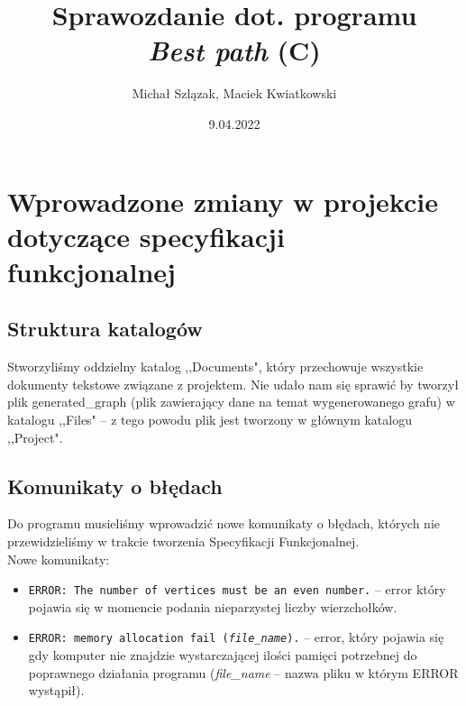 \documentclass[12pt, a4paper]{article}
\begin{document}
\title{Sprawozdanie dot. programu\\ \textit{Best path} (C)}
\date{9.04.2022}
\author{Michał Szlązak, Maciek Kwiatkowski}
\maketitle
\tableofcontents
\thispagestyle{empty}
\cleardoublepage

\newpage

\setcounter{page}{1}

\section{Wprowadzone zmiany w projekcie dotyczące specyfikacji funkcjonalnej}

\subsection{Struktura katalogów}
Stworzyliśmy oddzielny katalog ,,Documents", który przechowuje wszystkie dokumenty tekstowe związane z projektem. Nie udało nam się sprawić by tworzył plik generated\_graph (plik zawierający dane na temat wygenerowanego grafu) w katalogu ,,Files" -- z tego powodu plik jest tworzony w głównym katalogu ,,Project".

\subsection{Komunikaty o błędach}
Do programu musieliśmy wprowadzić nowe komunikaty o błędach, których nie przewidzieliśmy w trakcie tworzenia Specyfikacji Funkcjonalnej.
\\
Nowe komunikaty:
\begin{itemize}
    \item \texttt{ERROR: The number of vertices must be an even number.} -- error który pojawia się w momencie podania nieparzystej liczby wierzchołków.
    \item \texttt{ERROR: memory allocation fail (\textit{file\_name}).} -- error, który pojawia się gdy komputer nie znajdzie wystarczającej ilości pamięci potrzebnej do poprawnego działania programu (\textit{file\_name} -- nazwa pliku w którym ERROR wystąpił).
\end{itemize}
\end{document}
